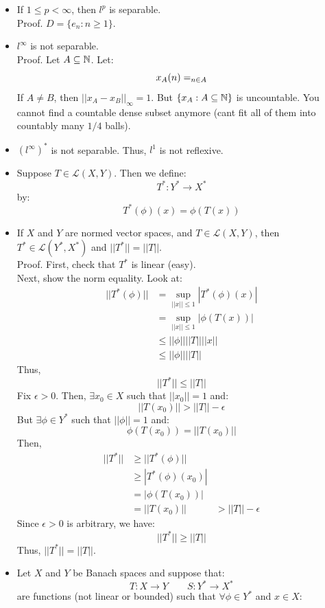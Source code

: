 \documentclass[12pt]{article}
\begin{document}
\begin{itemize}
    \item[Corr.] If $1 \leq p < \infty$, then $l^p$ is separable. \\
    Proof. $D = \{e_n : n \geq 1\}$.  
    \item[Ex.] $l^\infty$ is not separable. \\
    Proof. Let $A \subseteq \mathbb N$. Let: 
    \[ x_A(n) = \relax_{n \in A}\]
    If $A \neq B$, then $||x_A - x_B||_\infty = 1$. But $\{x_A : A \subseteq \mathbb N\}$ is uncountable. You cannot find a countable dense subset anymore (cant fit all of them into countably many $1/4$ balls).
    \item[Hwk.] $(l^\infty)^*$ is not separable. Thus, $l^1$ is not reflexive.  
    \item[Defn.] Suppose $T \in \mathcal{L}(X, Y)$. Then we define: 
    \[ T^*: Y^* \to X^*\]
    by: 
    \[ T^*(\phi)(x) = \phi(T(x))\]
    \item[Prop.] If $X$ and $Y$ are normed vector spaces, and $T \in \mathcal{L}(X,Y)$, then $T^* \in \mathcal{L}(Y^*, X^*)$ and $||T^*|| = ||T||$. \\
    Proof. First, check that $T^*$ is linear (easy). \\
    Next, show the norm equality. Look at: 
    \begin{align*}
        ||T^*(\phi)|| &= \sup_{||x|| \leq 1} |T^*(\phi)(x)| \\
        &= \sup_{||x|| \leq 1} |\phi(T(x))| \\
        &\leq ||\phi||||T||||x|| \\
        &\leq ||\phi||||T||
    \end{align*}
    Thus, 
    \[ ||T^*|| \leq ||T||\] 
    Fix $\epsilon > 0$. Then, $\exists x_0 \in X$ such that $||x_0|| = 1$ and: 
    \[ ||T(x_0)|| > ||T|| - \epsilon\]
    But $\exists \phi \in Y^*$ such that $||\phi|| = 1$ and:
    \[ \phi(T(x_0)) = ||T(x_0)|| \]
    Then, 
    \begin{align*}
        ||T^*|| &\geq ||T^*(\phi)|| \\
        &\geq |T^*(\phi)(x_0)| \\
        &= |\phi(T(x_0))| \\
        &= ||T(x_0)||
        &> ||T|| - \epsilon
    \end{align*}
    Since $\epsilon > 0$ is arbitrary, we have:
    \[ ||T^*|| \geq ||T||\]
    Thus, $||T^*|| = ||T||$.
    \item[Thm.] Let $X$ and $Y$ be Banach spaces and suppose that: 
    \[ T: X \to Y \qquad S: Y^* \to X^* \]
    are functions (not linear or bounded) such that $\forall \phi \in Y^*$ and $x \in X$: 

\end{itemize}
\end{document}
